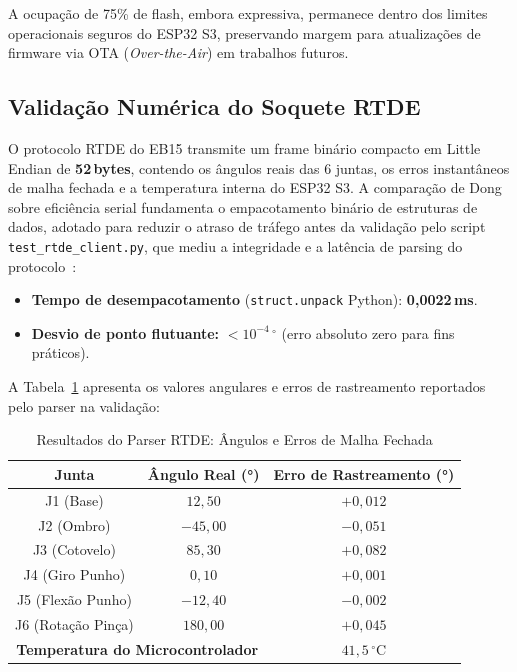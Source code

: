 A ocupação de 75\% de flash, embora expressiva, permanece dentro dos limites operacionais seguros do ESP32 S3, preservando margem para atualizações de firmware via OTA (\textit{Over-the-Air}) em trabalhos futuros.

\subsection{Validação Numérica do Soquete RTDE}
\label{subsec:dev_rede_rtde}

O protocolo RTDE do EB15 transmite um frame binário compacto em Little Endian de \textbf{52\,bytes}, contendo os ângulos reais das 6 juntas, os erros instantâneos de malha fechada e a temperatura interna do ESP32 S3. A comparação de Dong sobre eficiência serial fundamenta o empacotamento binário de estruturas de dados, adotado para reduzir o atraso de tráfego antes da validação pelo script \texttt{test\_rtde\_client.py}, que mediu a integridade e a latência de parsing do protocolo~\cite{dong2022comparative}:

\begin{itemize}
    \item \textbf{Tempo de desempacotamento} (\texttt{struct.unpack} Python): \textbf{0,0022\,ms}.
    \item \textbf{Desvio de ponto flutuante:} $< 10^{-4}\,^{\circ}$ (erro absoluto zero para fins práticos).
\end{itemize}

A Tabela~\ref{tab:rtde_angulos} apresenta os valores angulares e erros de rastreamento reportados pelo parser na validação:

\begin{table}[h!]
\centering
\caption{Resultados do Parser RTDE: Ângulos e Erros de Malha Fechada}
\label{tab:rtde_angulos}
\begin{tabular}{|c|c|c|}
\hline
\textbf{Junta} & \textbf{Ângulo Real (°)} & \textbf{Erro de Rastreamento (°)} \\ \hline
J1 (Base)         & $12{,}50$  & $+0{,}012$ \\ \hline
J2 (Ombro)        & $-45{,}00$ & $-0{,}051$ \\ \hline
J3 (Cotovelo)     & $85{,}30$  & $+0{,}082$ \\ \hline
J4 (Giro Punho)   & $0{,}10$   & $+0{,}001$ \\ \hline
J5 (Flexão Punho) & $-12{,}40$ & $-0{,}002$ \\ \hline
J6 (Rotação Pinça)& $180{,}00$ & $+0{,}045$ \\ \hline
\multicolumn{2}{|c|}{\textbf{Temperatura do Microcontrolador}} & $41{,}5\,^{\circ}\text{C}$ \\ \hline
\end{tabular}
\end{table}

